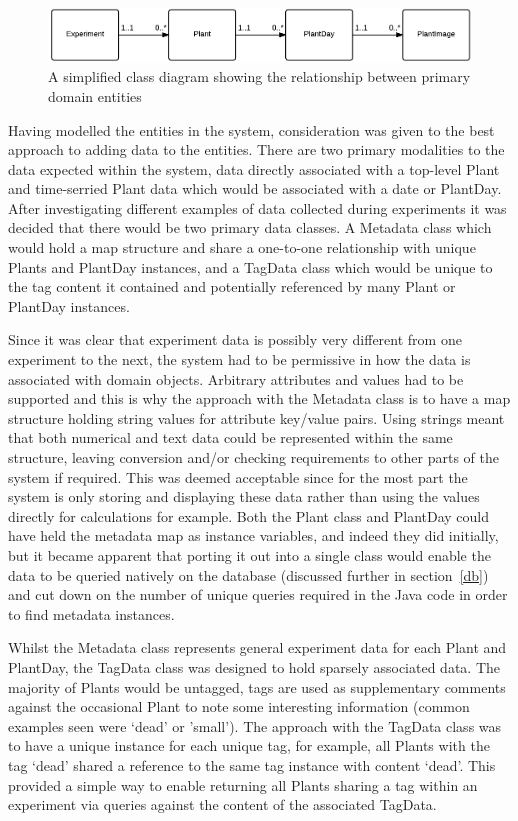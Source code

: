 \begin{figure}[H]
    \centering
    \includegraphics[width=\textwidth]{images/design/domain1}
    \caption{A simplified class diagram showing the relationship between primary domain entities}
    \label{fig:domain1}
\end{figure}


Having modelled the entities in the system, consideration was given to the best approach to adding data to the entities. There are two primary modalities to the data expected within the system, data directly associated with a top-level Plant and time-serried Plant data which would be associated with a date or PlantDay. After investigating different examples of data collected during experiments it was decided that there would be two primary data classes. A Metadata class which would hold a map structure and share a one-to-one relationship with unique Plants and PlantDay instances, and a TagData class which would be unique to the tag content it contained and potentially referenced by many Plant or PlantDay instances.

Since it was clear that experiment data is possibly very different from one experiment to the next, the system had to be permissive in how the data is associated with domain objects. Arbitrary attributes and values had to be supported and this is why the approach with the Metadata class is to have a map structure holding string values for attribute key/value pairs. Using strings meant that both numerical and text data could be represented within the same structure, leaving conversion and/or checking requirements to other parts of the system if required. This was deemed acceptable since for the most part the system is only storing and displaying these data rather than using the values directly for calculations for example. Both the Plant class and PlantDay could have held the metadata map as instance variables, and indeed they did initially, but it became apparent that porting it out into a single class would enable the data to be queried natively on the database (discussed further in section~\ref{db}) and cut down on the number of unique queries required in the Java code in order to find metadata instances.

Whilst the Metadata class represents general experiment data for each Plant and PlantDay, the TagData class was designed to hold sparsely associated data. The majority of Plants would be untagged, tags are used as supplementary comments against the occasional Plant to note some interesting information (common examples seen were `dead' or 'small'). The approach with the TagData class was to have a unique instance for each unique tag, for example, all Plants with the tag `dead' shared a reference to the same tag instance with content `dead'. This provided a simple way to enable returning all Plants sharing a tag within an experiment via queries against the content of the associated TagData.

